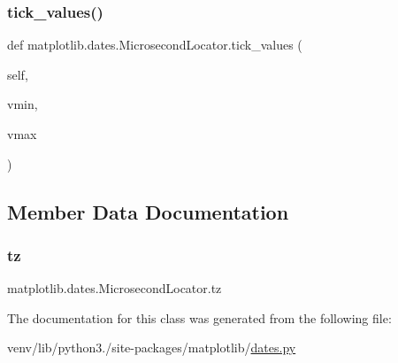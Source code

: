 \subsubsection{\texorpdfstring{tick\+\_\+values()}{tick\_values()}}
{\footnotesize\ttfamily def matplotlib.\+dates.\+Microsecond\+Locator.\+tick\+\_\+values (\begin{DoxyParamCaption}\item[{}]{self,  }\item[{}]{vmin,  }\item[{}]{vmax }\end{DoxyParamCaption})}



\subsection{Member Data Documentation}
\mbox{\label{classmatplotlib_1_1dates_1_1MicrosecondLocator_a525890ca6ae73c35dbe874579842c77e}} 
\subsubsection{\texorpdfstring{tz}{tz}}
{\footnotesize\ttfamily matplotlib.\+dates.\+Microsecond\+Locator.\+tz}



The documentation for this class was generated from the following file\+:\begin{DoxyCompactItemize}
\item 
venv/lib/python3./site-\/packages/matplotlib/\hyperlink{dates_8py}{dates.\+py}\end{DoxyCompactItemize}
